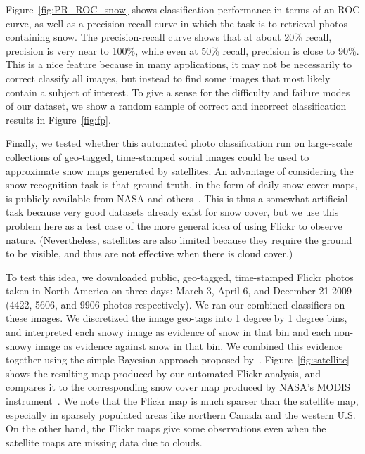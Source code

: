 Figure~\ref{fig:PR_ROC_snow} shows classification performance in
terms of an ROC curve, as well as a
precision-recall curve in which the task is to retrieval photos
containing snow. The precision-recall curve shows that at about 20\%
recall, precision is very near to 100\%, while even at 50\% recall,
precision is close to 90\%.  This is a nice feature because in many
applications, it may not be necessarily to correct classify all
images, but instead to find some images that most likely contain a
subject of interest.
%
To give a sense for the difficulty and failure modes of our dataset,
we show a random sample of correct and incorrect classification results
in Figure~\ref{fig:fp}.

 Finally, we tested whether
this automated photo classification run on large-scale collections of
geo-tagged, time-stamped social images could be used to approximate
snow maps generated by satellites.  An advantage of considering the
snow recognition task is that ground truth, in the form of daily snow
cover maps, is publicly available from NASA and
others~\cite{ecology2012www}. This is thus a somewhat artificial task
because very good datasets already exist for snow cover, but we use
this problem here as a test case of the more general idea of using
Flickr to observe nature. (Nevertheless, 
satellites are also limited because they require the ground to be
visible, and thus are not effective when there is cloud cover.)

To test this idea, we downloaded public, geo-tagged, time-stamped
Flickr photos taken in North America on three days: March 3, April 6,
and December 21 2009 (4422, 5606, and 9906 photos respectively).  We
ran our combined classifiers on these images. We discretized the image
geo-tags into 1 degree by 1 degree bins, and interpreted each snowy
image as evidence of snow in that bin and each non-snowy image as
evidence against snow in that bin. We combined this evidence together
using the simple Bayesian approach proposed by~\cite{ecology2012www}.
Figure~\ref{fig:satellite} shows the resulting map produced by our automated
Flickr analysis, and compares it to the corresponding snow cover map
produced by NASA's MODIS instrument~\cite{modissnow}. We note that
the Flickr map is much sparser than the satellite map, especially in 
sparsely populated areas like northern Canada and the western U.S. On
the other hand, the Flickr maps give some observations even when the
satellite maps are missing data due to clouds.

